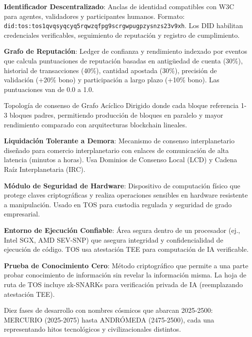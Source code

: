 \documentclass[11pt]{article}
\begin{document}
\begin{description}[leftmargin=3cm, style=nextline]
  \item[DID] \textbf{Identificador Descentralizado}: Anclas de identidad compatibles con W3C para agentes, validadores y participantes humanos. Formato: \texttt{did:tos:tos1qvqsyqcyq5rqwzqfpg9scrgwpugpzysnzs23v9xh}. Los DID habilitan credenciales verificables, seguimiento de reputación y registro de cumplimiento.

  \item[RepGraph] \textbf{Grafo de Reputación}: Ledger de confianza y rendimiento indexado por eventos que calcula puntuaciones de reputación basadas en antigüedad de cuenta (30\%), historial de transacciones (40\%), cantidad apostada (30\%), precisión de validación (+20\% bono) y participación a largo plazo (+10\% bono). Las puntuaciones van de 0.0 a 1.0.

  \item[BlockDAG] Topología de consenso de Grafo Acíclico Dirigido donde cada bloque referencia 1-3 bloques padres, permitiendo producción de bloques en paralelo y mayor rendimiento comparado con arquitecturas blockchain lineales.

  \item[DT-Settlement] \textbf{Liquidación Tolerante a Demora}: Mecanismo de consenso interplanetario diseñado para comercio interplanetario con enlaces de comunicación de alta latencia (minutos a horas). Usa Dominios de Consenso Local (LCD) y Cadena Raíz Interplanetaria (IRC).

  \item[HSM] \textbf{Módulo de Seguridad de Hardware}: Dispositivo de computación físico que protege claves criptográficas y realiza operaciones sensibles en hardware resistente a manipulación. Usado en TOS para custodia regulada y seguridad de grado empresarial.

  \item[TEE] \textbf{Entorno de Ejecución Confiable}: Área segura dentro de un procesador (ej., Intel SGX, AMD SEV-SNP) que asegura integridad y confidencialidad de ejecución de código. TOS usa atestación TEE para computación de IA verificable.

  \item[ZK Proof] \textbf{Prueba de Conocimiento Cero}: Método criptográfico que permite a una parte probar conocimiento de información sin revelar la información misma. La hoja de ruta de TOS incluye zk-SNARKs para verificación privada de IA (reemplazando atestación TEE).

  \item[Eras Celestiales] Diez fases de desarrollo con nombres cósmicos que abarcan 2025-2500: MERCURIO (2025-2075) hasta ANDRÓMEDA (2475-2500), cada una representando hitos tecnológicos y civilizacionales distintos.
\end{description}
\end{document}
